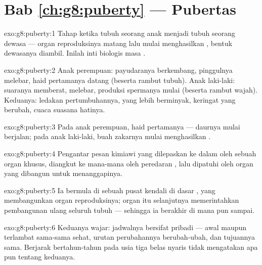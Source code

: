 \section*{Bab \ref{ch:g8:puberty} --- Pubertas}

\begin{solution}{exo:g8:puberty:1}
Tahap ketika tubuh seorang anak menjadi tubuh seorang
dewasa --- organ reproduksinya matang lalu mulai
menghasilkan , bentuk dewasanya diambil. Inilah inti
biologis masa .
\end{solution}

\begin{solution}{exo:g8:puberty:2}
Anak perempuan: payudaranya berkembang, pinggulnya melebar,
haid pertamanya datang (beserta rambut tubuh). Anak
laki-laki: suaranya memberat,  melebar, produksi
spermanya mulai (beserta rambut wajah). Keduanya: ledakan
pertumbuhannya,  yang lebih berminyak, keringat yang
berubah, cuaca suasana hatinya.
\end{solution}

\begin{solution}{exo:g8:puberty:3}
Pada anak perempuan, haid pertamanya --- daurnya mulai
berjalan; pada anak laki-laki, buah zakarnya mulai
menghasilkan .
\end{solution}

\begin{solution}{exo:g8:puberty:4}
Pengantar pesan kimiawi yang dilepaskan ke dalam  oleh
sebuah organ khusus, diangkut ke mana-mana oleh peredaran
, lalu dipatuhi oleh organ yang dibangun untuk
menanggapinya.
\end{solution}

\begin{solution}{exo:g8:puberty:5}
Ia bermula di sebuah pusat kendali di dasar , yang
 membangunkan organ reproduksinya;  organ itu
selanjutnya memerintahkan pembangunan ulang seluruh tubuh
--- sehingga ia berakhir di mana pun  sampai.
\end{solution}

\begin{solution}{exo:g8:puberty:6}
Keduanya wajar: jadwalnya bersifat pribadi --- awal maupun
terlambat sama-sama sehat, urutan perubahannya berubah-ubah,
dan tujuannya sama. Berjarak bertahun-tahun pada usia tiga
belas nyaris tidak mengatakan apa pun tentang keduanya.
\end{solution}

